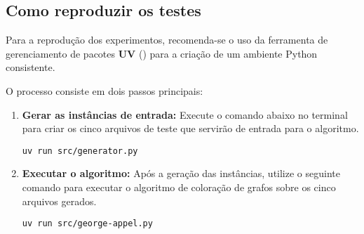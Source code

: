 \subsection{Como reproduzir os testes}

Para a reprodução dos experimentos, recomenda-se o uso da ferramenta de gerenciamento 
de pacotes \textbf{UV} (\textcite{uv}) para a criação de um ambiente Python consistente.

O processo consiste em dois passos principais:

\begin{enumerate}
    \item \textbf{Gerar as instâncias de entrada:} Execute o comando abaixo no terminal 
    para criar os cinco arquivos de teste que servirão de entrada para o algoritmo.
    
    \begin{center}
        \texttt{uv run src/generator.py}
    \end{center}

    \item \textbf{Executar o algoritmo:} Após a geração das instâncias, utilize o 
    seguinte comando para executar o algoritmo de coloração de grafos sobre os 
    cinco arquivos gerados.
    
    \begin{center}
        \texttt{uv run src/george-appel.py}
    \end{center}
\end{enumerate}

